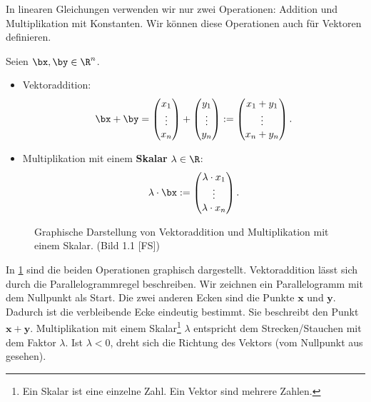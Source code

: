 In linearen Gleichungen verwenden wir nur zwei Operationen: Addition und Multiplikation mit Konstanten. Wir können diese Operationen auch für Vektoren definieren.
\begin{definition} \label{def:2:vektoroperationen}
	Seien $\bx, \by \in \R^n$.
	\begin{itemize}
		\item Vektoraddition:
		      $$\bx + \by =\begin{pmatrix}
				      x_1 \\ \vdots \\ x_n
			      \end{pmatrix} + \begin{pmatrix}
				      y_1 \\ \vdots \\  y_n
			      \end{pmatrix} := \begin{pmatrix}
				      x_1 + y_1 \\ \vdots \\ x_n + y_n
			      \end{pmatrix}.$$
		\item Multiplikation mit einem \textbf{Skalar} $\lambda \in \R$:
		      $$ \lambda \cdot \bx := \begin{pmatrix}
				      \lambda \cdot x_1 \\ \vdots \\ \lambda \cdot x_n
			      \end{pmatrix}.$$
	\end{itemize}
\end{definition}

\begin{figure}
	\centering
	\caption{Graphische Darstellung von Vektoraddition und Multiplikation mit einem Skalar. (Bild 1.1 [FS])}
	\label{fig:2:vektoraddition}
\end{figure}

In \cref{fig:2:vektoraddition} sind die beiden Operationen graphisch dargestellt. Vektoraddition lässt sich durch die Parallelogrammregel beschreiben. Wir zeichnen ein Parallelogramm mit dem Nullpunkt als Start. Die zwei anderen Ecken sind die Punkte $\bm x$ und $\bm y$. Dadurch ist die verbleibende Ecke eindeutig bestimmt. Sie beschreibt den Punkt $\bm x + \bm y$. Multiplikation mit einem Skalar\footnote{Ein Skalar ist eine einzelne Zahl. Ein Vektor sind mehrere Zahlen.}  $\lambda$ entspricht dem Strecken/Stauchen mit dem Faktor $\lambda$. Ist $\lambda < 0$, dreht sich die Richtung des Vektors (vom Nullpunkt aus gesehen).

